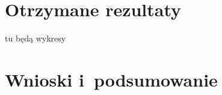 \documentclass[12pt]{article}
\begin{document}
\section{Otrzymane rezultaty}\label{chapter: rezultaty}
tu będą wykresy
\section{Wnioski i~podsumowanie}
\end{document}
